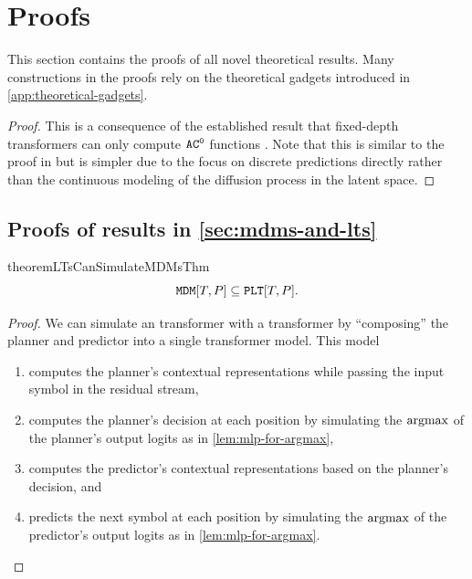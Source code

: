 \section{Proofs} \label{app:proofs}
This section contains the proofs of all novel theoretical results. 
Many constructions in the proofs rely on the theoretical gadgets introduced in \cref{app:theoretical-gadgets}.

\perfectApproximationTheorem*
\begin{proof}
   This is a consequence of the established result that fixed-depth transformers can only compute ${{{{{{\mathtt{AC}}}^{\mathtt{0}}}}}}$ functions \citep[][\textit{inter alia}]{li2024chain,saunshi2025reasoninglatentthoughtspower,london2025pausetokensstrictlyincrease}.
   Note that this is similar to the proof in \citet{liu2025perfectdiffusionmathsftc0,liu2025serialscalinghypothesis} but is simpler due to the focus on discrete predictions directly rather than the continuous modeling of the diffusion process in the latent space.
\end{proof}


\subsection{Proofs of results in \texorpdfstring{\cref{sec:mdms-and-lts}}{Section 3.2}}

\begin{restatable}{theorem}{LTsCanSimulateMDMsThm} \label{thm:lts-can-simulate-mdms}
   \begin{equation}
      {\mathtt{MDM}}[{T}, {P}] \subseteq {\mathtt{PLT}}[{T}, {P}].
   \end{equation}
\end{restatable}
\begin{proof}
   We can simulate an \eMDMAcr transformer with a \LTAcr transformer by ``composing'' the planner and predictor into a single transformer model.
   This model
   \begin{enumerate}[label=(\arabic*)]
      \item computes the planner's contextual representations while passing the input symbol in the residual stream, 
      \item computes the planner's decision at each position by simulating the $\operatorname*{{{argmax}}}$ of the planner's output logits as in \cref{lem:mlp-for-argmax},
      \item computes the predictor's contextual representations based on the planner's decision, and
      \item predicts the next symbol at each position by simulating the $\operatorname*{{{argmax}}}$ of the predictor's output logits as in \cref{lem:mlp-for-argmax}.
   \end{enumerate} 
\end{proof}

